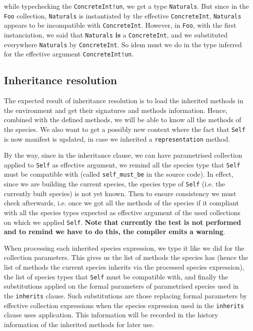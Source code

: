 \noindent while typechecking the {\tt ConcreteInt!un}, we get a type
{\tt Naturals}. But since in the {\tt Foo} collection, {\tt Naturals} is
instantiated by the effective {\tt ConcreteInt}, {\tt Naturals} appears
to be incompatible with {\tt ConcreteInt}. However, in {\tt Foo}, with
the first instanciation, we said that {\tt Naturals} {\bf is} a
{\tt ConcreteInt}, and we substituted everywhere {\tt Naturals} by
{\tt ConcreteInt}. So idem must we do in the type inferred for the
effective argument {\tt ConcreteInt!un}.



\subsection{Inheritance resolution}
\label{inheritance-resolution}
The expected result of inheritance resolution is to load the inherited
methods in the environment and get their signatures and methods
information. Hence, combined with the defined methods, we will be able
to know all the methods of the species. We also want to get a possibly
new context where the fact that {\tt Self} is now manifest is
updated, in case we inherited a {\tt representation} method.

By the way, since in the inheritance clause, we can have parametrised
collection applied to {\tt Self} as effective argument, we remind all
the species type that {\tt Self} must be compatible with (called
{\tt self\_must\_be} in the source code). In effect, since we are
building the current species, the species type of {\tt Self} (i.e. the
currently built species) is not yet known. Then to ensure consistency
we must check afterwards, i.e. once we got all the methods of the
species if it compliant with all the species types expected as
effective argument of the used collections on which we applied
{\tt Self}.
\label{cadaver-self-must-be}
{\bf {\large Note that currently the test is not performed
and to remind we have to do this, the compiler emits a warning}}.

\medskip
When processing each inherited species expression, we type it like we
did for the collection parameters. This gives us the list of methods
the species has (hence the list of methods the current species inherits
via the processed species expression), the list of species types that
{\tt Self} must be compatible with, and finally the substitutions
applied on the formal parameters of parametrised species used in the
{\tt inherits} clause. Such substitutions are those replacing formal
parameters by effective collection expressions when the species
expression used in the {\tt inherits} clause uses application.
This information will be recorded in the history information of the
inherited methods for later use.

